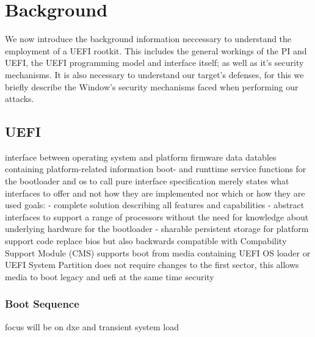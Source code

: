 
\chapter{Background}

We now introduce the background information neccessary to understand the employment of a \ac{UEFI} rootkit. This includes the general workings of the \acf{PI} and \ac{UEFI}, the \ac{UEFI} programming model and interface itself; as well as it's security mechanisms. It is also necessary to understand our target's defenses, for this we briefly describe the Window's security mechanisms faced when performing our attacks.

\section{\acf{UEFI}}

interface between operating system and platform firmware
data datables containing platform-related information
boot- and runttime service functions for the bootloader and os to call
pure interface specification
merely states what interfaces to offer and not how they are implemented nor which or how they are used
goals:
- complete solution describing all features and capabilities
- abstract interfaces to support a range of processors without the need for knowledge about underlying hardware for the bootloader
- sharable persistent storage for platform support code
replace bios but also backwards compatible with Compability Support Module (CMS)
supports boot from media containing UEFI OS loader or UEFI System Partition
does not require changes to the first sector, this allows media to boot legacy and uefi at the same time
security

\subsection{Boot Sequence}

focus will be on dxe and transient system load

